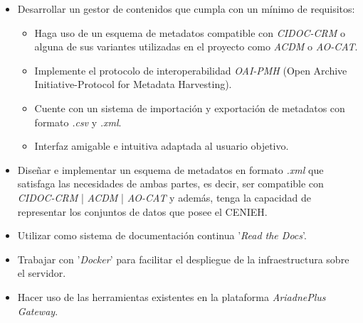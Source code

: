 \begin{itemize}
\tightlist
\item
Desarrollar un gestor de contenidos que cumpla con un mínimo de requisitos:
\begin{itemize}
\tightlist
\item 
Haga uso de un esquema de metadatos compatible con \emph{CIDOC-CRM} o alguna de sus variantes utilizadas en el proyecto como \emph{ACDM} o \emph{AO-CAT}.
\item
Implemente el protocolo de interoperabilidad \emph{OAI-PMH} (Open Archive Initiative-Protocol for Metadata Harvesting).
\item
Cuente con un sistema de importación y exportación de metadatos con formato \emph{.csv} y \emph{.xml}.
\item
Interfaz amigable e intuitiva adaptada al usuario objetivo.
\end{itemize}
\item
Diseñar e implementar un esquema de metadatos en formato \emph{.xml} que satisfaga las necesidades de ambas partes, es decir, ser compatible con \emph{CIDOC-CRM} | \emph{ACDM} | \emph{AO-CAT} y además, tenga la capacidad de representar los conjuntos de datos que posee el CENIEH.
\item
Utilizar como sistema de documentación continua '\emph{Read the Docs}'.
\item
Trabajar con '\emph{Docker}' para facilitar el despliegue de la infraestructura sobre el servidor.
\item
Hacer uso de las herramientas existentes en la plataforma \emph{AriadnePlus Gateway}.
\end{itemize}

